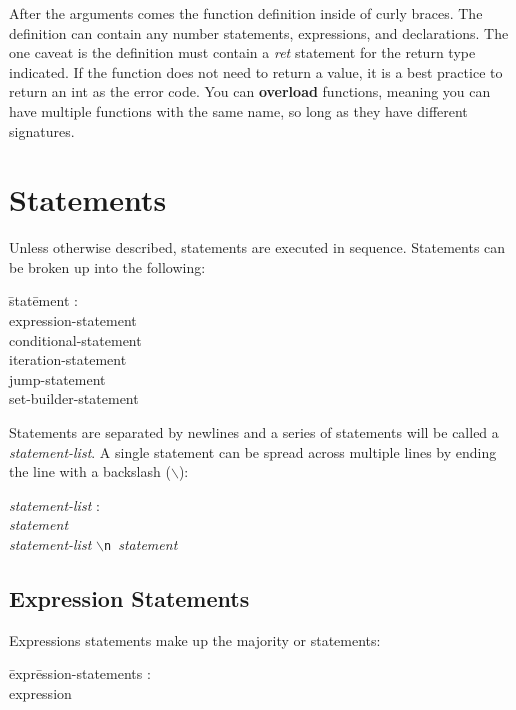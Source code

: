 \documentclass{article}
\begin{document}
After the arguments comes the function definition inside of curly braces. The definition can contain any number statements, expressions, and declarations. The one caveat is the definition must contain a \emph{ret} statement for the return type indicated. If the function does not need to return a value, it is a best practice to return an int as the error code. You can \textbf{overload} functions, meaning you can have multiple functions with the same name, so long as they have different signatures.

\section{Statements}
Unless otherwise described, statements are executed in sequence. Statements can be broken up into the following:
\begin{itshape}
\begin{tabbing}
	\= stat\=ement : \\
		\> \> expression-statement \\
		\>\> conditional-statement \\
		\> \> iteration-statement \\
		\> \> jump-statement \\
		\> \> set-builder-statement  
\end{tabbing}
\end{itshape}

Statements are separated by newlines and a series of statements will be called a \emph{statement-list}. A single statement can be spread across multiple lines by ending the line with a backslash ($\backslash$):
\begin{tabbing}
	\= \emph{stat}\=\emph{ement-list} : \\
		\> \> \emph{statement} \\
		\> \> \emph{statement-list} \texttt{$\backslash$n }\emph{statement}
\end{tabbing}


\subsection{Expression Statements}
Expressions statements make up the majority or statements:

\begin{itshape}
\begin{tabbing}
	\= expr\=ession-statements : \\
		\>\> expression
\end{tabbing}
\end{itshape}
\end{document}
